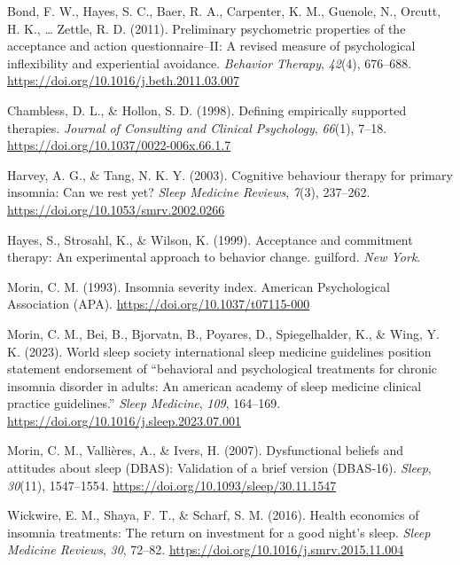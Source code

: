 \documentclass[
  english,
  man]{apa6}
\newlength{\cslhangindent}
\newenvironment{CSLReferences}[2] %
 {\begin{list}{}{%
  \setlength{\itemindent}{0pt}
  \setlength{\leftmargin}{0pt}
  \setlength{\parsep}{0pt}
  \ifodd #1
   \setlength{\leftmargin}{\cslhangindent}
   \setlength{\itemindent}{-1\cslhangindent}
  \fi
  \setlength{\itemsep}{#2\baselineskip}}}
 {\end{list}}
\begin{document}
\label{refs}
\begin{CSLReferences}{1}{0}
Bond, F. W., Hayes, S. C., Baer, R. A., Carpenter, K. M., Guenole, N., Orcutt, H. K., \ldots{} Zettle, R. D. (2011). Preliminary psychometric properties of the acceptance and action questionnaire--II: A revised measure of psychological inflexibility and experiential avoidance. \emph{Behavior Therapy}, \emph{42}(4), 676--688. \url{https://doi.org/10.1016/j.beth.2011.03.007}

Chambless, D. L., \& Hollon, S. D. (1998). Defining empirically supported therapies. \emph{Journal of Consulting and Clinical Psychology}, \emph{66}(1), 7--18. \url{https://doi.org/10.1037/0022-006x.66.1.7}

Harvey, A. G., \& Tang, N. K. Y. (2003). Cognitive behaviour therapy for primary insomnia: Can we rest yet? \emph{Sleep Medicine Reviews}, \emph{7}(3), 237--262. \url{https://doi.org/10.1053/smrv.2002.0266}

Hayes, S., Strosahl, K., \& Wilson, K. (1999). Acceptance and commitment therapy: An experimental approach to behavior change. guilford. \emph{New York}.

Morin, C. M. (1993). Insomnia severity index. American Psychological Association (APA). \url{https://doi.org/10.1037/t07115-000}

Morin, C. M., Bei, B., Bjorvatn, B., Poyares, D., Spiegelhalder, K., \& Wing, Y. K. (2023). World sleep society international sleep medicine guidelines position statement endorsement of {``behavioral and psychological treatments for chronic insomnia disorder in adults: An american academy of sleep medicine clinical practice guidelines.''} \emph{Sleep Medicine}, \emph{109}, 164--169. \url{https://doi.org/10.1016/j.sleep.2023.07.001}

Morin, C. M., Vallières, A., \& Ivers, H. (2007). Dysfunctional beliefs and attitudes about sleep (DBAS): Validation of a brief version (DBAS-16). \emph{Sleep}, \emph{30}(11), 1547--1554. \url{https://doi.org/10.1093/sleep/30.11.1547}

Wickwire, E. M., Shaya, F. T., \& Scharf, S. M. (2016). Health economics of insomnia treatments: The return on investment for a good night's sleep. \emph{Sleep Medicine Reviews}, \emph{30}, 72--82. \url{https://doi.org/10.1016/j.smrv.2015.11.004}


\end{CSLReferences}
\end{document}
